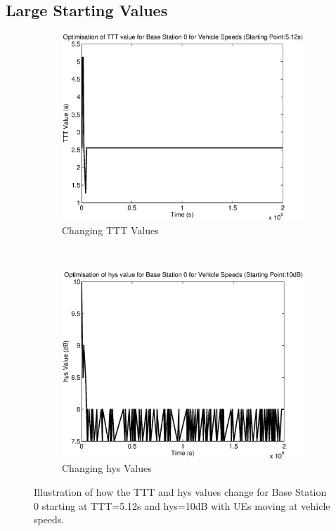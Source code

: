 \subsection{Large Starting Values}\label{ap:veh_large}
\begin{figure}[H]
        \centering
        \begin{subfigure}[b]{0.49\textwidth}
                \includegraphics[width=\textwidth]{figures/graphs/vehhigh/TTT0.eps}
                \caption{Changing TTT Values}
        \end{subfigure}%
        ~ %
        \begin{subfigure}[b]{0.49\textwidth}
                \includegraphics[width=\textwidth]{figures/graphs/vehhigh/hys0.eps}
                \caption{Changing hys Values}
        \end{subfigure}
        \caption{Illustration of how the TTT and hys values change for Base Station 0 starting at TTT=5.12s and hys=10dB with UEs moving at vehicle speeds.}
\end{figure}
